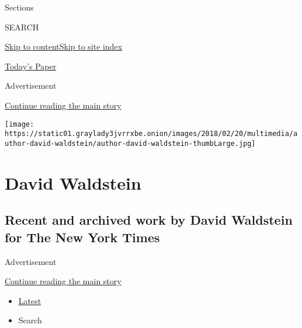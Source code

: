 Sections

SEARCH

\protect\hyperlink{site-content}{Skip to
content}\protect\hyperlink{site-index}{Skip to site index}

\href{https://myaccount.nytimes3xbfgragh.onion/auth/login?response_type=cookie\&client_id=vi}{}

\href{https://www.nytimes3xbfgragh.onion/section/todayspaper}{Today's
Paper}

Advertisement

\protect\hyperlink{after-top}{Continue reading the main story}

\texttt{[image: https://static01.graylady3jvrrxbe.onion/images/2018/02/20/multimedia/author-david-waldstein/author-david-waldstein-thumbLarge.jpg]}

\hypertarget{david-waldstein}{%
\section{David Waldstein}\label{david-waldstein}}

\hypertarget{recent-and-archived-work-by-david-waldstein-for-the-new-york-times}{%
\subsection{Recent and archived work by David Waldstein for The New York
Times}\label{recent-and-archived-work-by-david-waldstein-for-the-new-york-times}}

Advertisement

\protect\hyperlink{after-mid1}{Continue reading the main story}

\begin{itemize}
\tightlist
\item
  \protect\hyperlink{stream-panel}{Latest}
\item
  Search
\end{itemize}


